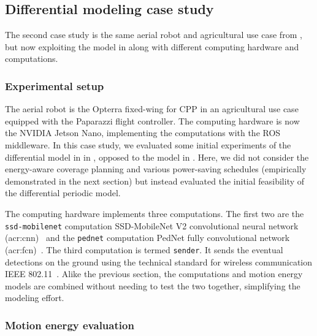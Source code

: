 \subsection{Differential modeling case study}
\label{sec:res-diff}

The second case study is the same aerial robot and agricultural use case from , but now exploiting the model in  along with different computing hardware and computations.

\subsubsection*{Experimental setup}

The aerial robot is the Opterra fixed-wing for CPP in an agricultural use case equipped with the Paparazzi flight controller. The computing hardware is now the NVIDIA Jetson Nano, implementing the computations with the ROS middleware. In this case study, we evaluated some initial experiments of the differential model in  in , opposed to the model in . Here, we did not consider the energy-aware coverage planning and various power-saving schedules (empirically demonstrated in the next section) but instead evaluated the initial feasibility of the differential periodic model.

The computing hardware implements three computations. The first two are the {\small\tt ssd-mobilenet} computation SSD-MobileNet V2 convolutional neural network (\Gls{acr:cnn})~\citep{sandler2018mobilenetv2} and the {\small\tt pednet} computation PedNet fully convolutional network (\Gls{acr:fcn})~\citep{ullah2018pednet}. The third computation is termed {\small\tt sender}. It sends the eventual detections on the ground using the technical standard for wireless communication IEEE 802.11~\citep{crow1997ieee}. Alike the previous section, the computations and motion energy models are combined without needing to test the two together, simplifying the modeling effort. 

\subsubsection*{Motion energy evaluation}

